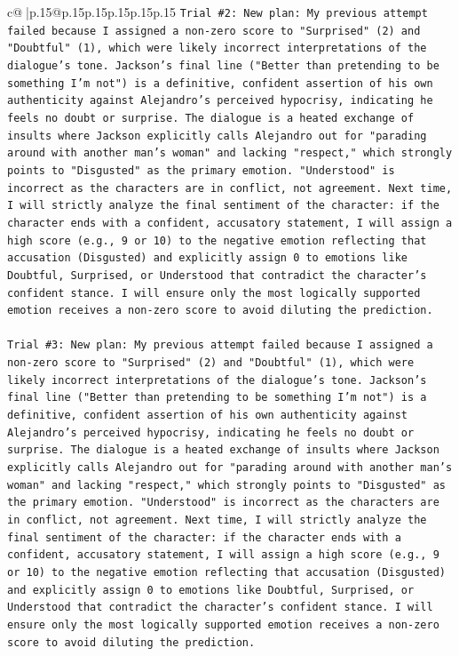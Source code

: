 \documentclass{article}
\begin{document}
{\begin{supertabular}{c@{$\;$}|p{.15\linewidth}@{}p{.15\linewidth}p{.15\linewidth}p{.15\linewidth}p{.15\linewidth}p{.15\linewidth}}
{{{\texttt{Trial \#2: New plan: My previous attempt failed because I assigned a non{-}zero score to "Surprised" (2) and "Doubtful" (1), which were likely incorrect interpretations of the dialogue's tone. Jackson's final line ("Better than pretending to be something I'm not") is a definitive, confident assertion of his own authenticity against Alejandro's perceived hypocrisy, indicating he feels no doubt or surprise. The dialogue is a heated exchange of insults where Jackson explicitly calls Alejandro out for "parading around with another man's woman" and lacking "respect," which strongly points to "Disgusted" as the primary emotion. "Understood" is incorrect as the characters are in conflict, not agreement. Next time, I will strictly analyze the final sentiment of the character: if the character ends with a confident, accusatory statement, I will assign a high score (e.g., 9 or 10) to the negative emotion reflecting that accusation (Disgusted) and explicitly assign 0 to emotions like Doubtful, Surprised, or Understood that contradict the character's confident stance. I will ensure only the most logically supported emotion receives a non{-}zero score to avoid diluting the prediction.} \\
\\ 
\texttt{Trial \#3: New plan: My previous attempt failed because I assigned a non{-}zero score to "Surprised" (2) and "Doubtful" (1), which were likely incorrect interpretations of the dialogue's tone. Jackson's final line ("Better than pretending to be something I'm not") is a definitive, confident assertion of his own authenticity against Alejandro's perceived hypocrisy, indicating he feels no doubt or surprise. The dialogue is a heated exchange of insults where Jackson explicitly calls Alejandro out for "parading around with another man's woman" and lacking "respect," which strongly points to "Disgusted" as the primary emotion. "Understood" is incorrect as the characters are in conflict, not agreement. Next time, I will strictly analyze the final sentiment of the character: if the character ends with a confident, accusatory statement, I will assign a high score (e.g., 9 or 10) to the negative emotion reflecting that accusation (Disgusted) and explicitly assign 0 to emotions like Doubtful, Surprised, or Understood that contradict the character's confident stance. I will ensure only the most logically supported emotion receives a non{-}zero score to avoid diluting the prediction.} \\
\\ 
\\ 
}}}
\end{supertabular}}
\end{document}
